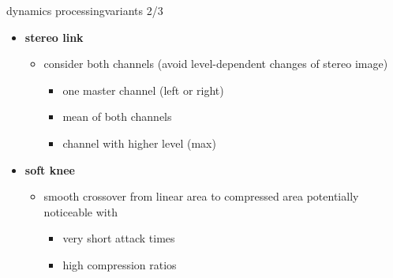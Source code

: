 \begin{frame}{dynamics processing}{variants 2/3}
	\vspace{-3mm}
    \begin{itemize}
		\item	\textbf{stereo link}
			\begin{itemize}
				\item	consider both channels (avoid level-dependent changes of stereo image)
					\pause
					\begin{itemize}
						\item	one master channel (left or right)
						\item	mean of both channels
						\item	channel with higher level (max)
					\end{itemize}
			\end{itemize}
		\pause
        \smallskip
        \smallskip
		\item	\textbf{soft knee}
			\begin{itemize}
				\item	smooth crossover from linear area to compressed area
					\vspace{-20mm}
					\pause
					potentially noticeable with
					\begin{itemize}
						\item	very short attack times
						\item	high compression ratios	
					\end{itemize}
			\end{itemize}
	\end{itemize}
\end{frame}

